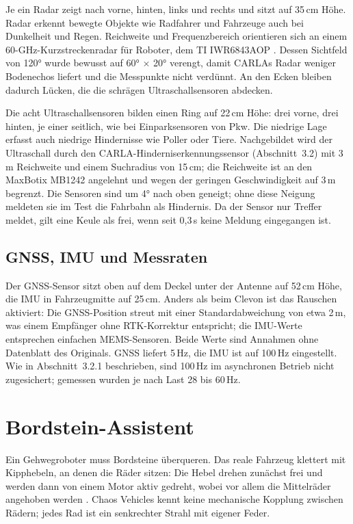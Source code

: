 Je ein Radar zeigt nach vorne, hinten, links und rechts und sitzt auf 35\,cm Höhe. Radar
erkennt bewegte Objekte wie Radfahrer und Fahrzeuge auch bei Dunkelheit und Regen.
Reichweite und Frequenzbereich orientieren sich an einem 60-GHz-Kurzstreckenradar für
Roboter, dem TI IWR6843AOP \parencite{ti_iwr6843aop}. Dessen Sichtfeld von 120° wurde
bewusst auf 60° $\times$ 20° verengt, damit CARLAs Radar weniger Bodenechos liefert und
die Messpunkte nicht verdünnt. An den Ecken bleiben dadurch Lücken, die die schrägen
Ultraschallsensoren abdecken.

Die acht Ultraschallsensoren bilden einen Ring auf 22\,cm Höhe: drei vorne, drei hinten,
je einer seitlich, wie bei Einparksensoren von Pkw. Die niedrige Lage erfasst auch
niedrige Hindernisse wie Poller oder Tiere. Nachgebildet wird der Ultraschall durch den
CARLA-Hinderniserkennungssensor (Abschnitt~3.2) mit 3\,m Reichweite und einem Suchradius
von 15\,cm; die Reichweite ist an den MaxBotix MB1242 angelehnt \parencite{maxbotix_mb1242}
und wegen der geringen Geschwindigkeit auf 3\,m begrenzt. Die Sensoren sind um 4° nach
oben geneigt; ohne diese Neigung meldeten sie im Test die Fahrbahn als Hindernis. Da der
Sensor nur Treffer meldet, gilt eine Keule als frei, wenn seit 0,3\,s keine Meldung
eingegangen ist.

\subsection{GNSS, IMU und Messraten}
\label{sec:starship_navigation}

Der GNSS-Sensor sitzt oben auf dem Deckel unter der Antenne auf 52\,cm Höhe, die IMU in
Fahrzeugmitte auf 25\,cm. Anders als beim Clevon ist das Rauschen aktiviert: Die
GNSS-Position streut mit einer Standardabweichung von etwa 2\,m, was einem Empfänger ohne
RTK-Korrektur entspricht; die IMU-Werte entsprechen einfachen MEMS-Sensoren. Beide Werte
sind Annahmen ohne Datenblatt des Originals. GNSS liefert 5\,Hz, die IMU ist auf 100\,Hz
eingestellt. Wie in Abschnitt~3.2.1 beschrieben, sind 100\,Hz im asynchronen Betrieb
nicht zugesichert; gemessen wurden je nach Last 28 bis 60\,Hz.

\section{Bordstein-Assistent}
\label{sec:starship_bordstein}

Ein Gehwegroboter muss Bordsteine überqueren. Das reale Fahrzeug klettert mit
Kipphebeln, an denen die Räder sitzen: Die Hebel drehen zunächst frei und werden dann
von einem Motor aktiv gedreht, wobei vor allem die Mittelräder angehoben werden
\parencite{starship_patent_bogie}. Chaos Vehicles kennt keine mechanische Kopplung
zwischen Rädern; jedes Rad ist ein senkrechter Strahl mit eigener Feder.

